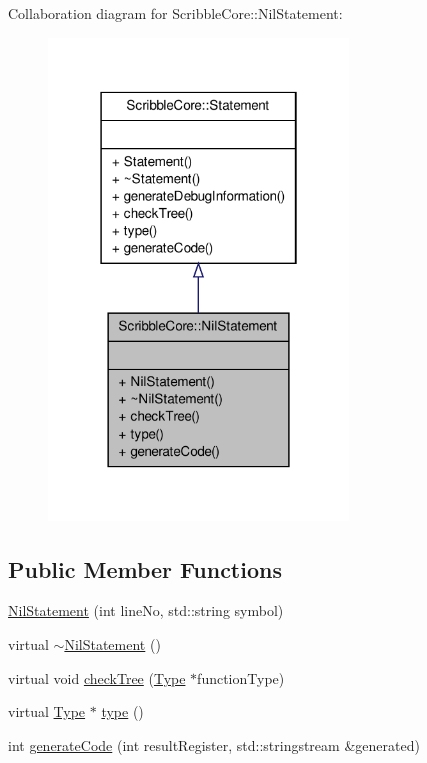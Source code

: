 Collaboration diagram for Scribble\-Core\-:\-:Nil\-Statement\-:
\nopagebreak
\begin{figure}[H]
\begin{center}
\leavevmode
\includegraphics[width=226pt]{class_scribble_core_1_1_nil_statement__coll__graph}
\end{center}
\end{figure}
\subsection*{Public Member Functions}
\begin{DoxyCompactItemize}
\item 
\hyperlink{class_scribble_core_1_1_nil_statement_a4cde3072f023797756406791f1810125}{Nil\-Statement} (int line\-No, std\-::string symbol)
\item 
virtual \hyperlink{class_scribble_core_1_1_nil_statement_a28570352a04c97f4c5cd2be7e1973c2b}{$\sim$\-Nil\-Statement} ()
\item 
virtual void \hyperlink{class_scribble_core_1_1_nil_statement_ae3c310725c9ba1121ef565025ad370a0}{check\-Tree} (\hyperlink{class_scribble_core_1_1_type}{Type} $\ast$function\-Type)
\item 
virtual \hyperlink{class_scribble_core_1_1_type}{Type} $\ast$ \hyperlink{class_scribble_core_1_1_nil_statement_a0a2ef65936abfe643a9cb554673d52a9}{type} ()
\item 
int \hyperlink{class_scribble_core_1_1_nil_statement_a2edbb2432dd509a886f22a2794cd2d69}{generate\-Code} (int result\-Register, std\-::stringstream \&generated)
\end{DoxyCompactItemize}


